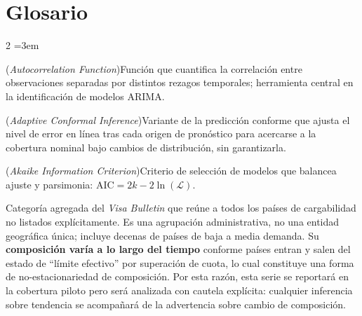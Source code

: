 \documentclass[12pt,letterpaper]{report}
\begin{document}
\chapter*{Glosario}

\begin{multicols}{2}
\setlength{\columnsep}{14pt}
\scriptsize
\sloppy   %
\emergencystretch=3em  %
\begin{description}[leftmargin=0pt, labelindent=0pt, itemindent=0pt,
                    labelsep=0.4em, font=\bfseries\scriptsize,
                    itemsep=1pt, parsep=0pt, topsep=0pt]
    \item[ACF] (\textit{Autocorrelation Function})\hspace{0.3em}Función que cuantifica la correlación entre observaciones separadas por distintos rezagos temporales; herramienta central en la identificación de modelos ARIMA.

    \item[ACI] (\textit{Adaptive Conformal Inference})\hspace{0.3em}Variante de la predicción conforme que ajusta el nivel de error en línea tras cada origen de pronóstico para acercarse a la cobertura nominal bajo cambios de distribución, sin garantizarla.

    \item[AIC] (\textit{Akaike Information Criterion})\hspace{0.3em}Criterio de selección de modelos que balancea ajuste y parsimonia: $\text{AIC} = 2k - 2\ln(\mathcal{L})$.

    \item[All Chargeability Areas Except Those Listed] Categoría agregada del \textit{Visa Bulletin} que reúne a todos los países de cargabilidad no listados explícitamente. Es una agrupación administrativa, no una entidad geográfica única; incluye decenas de países de baja a media demanda. Su \textbf{composición varía a lo largo del tiempo} conforme países entran y salen del estado de ``límite efectivo'' por superación de cuota, lo cual constituye una forma de no-estacionariedad de composición. Por esta razón, esta serie se reportará en la cobertura piloto pero será analizada con cautela explícita: cualquier inferencia sobre tendencia se acompañará de la advertencia sobre cambio de composición.


\end{description}
\end{multicols}
\end{document}
